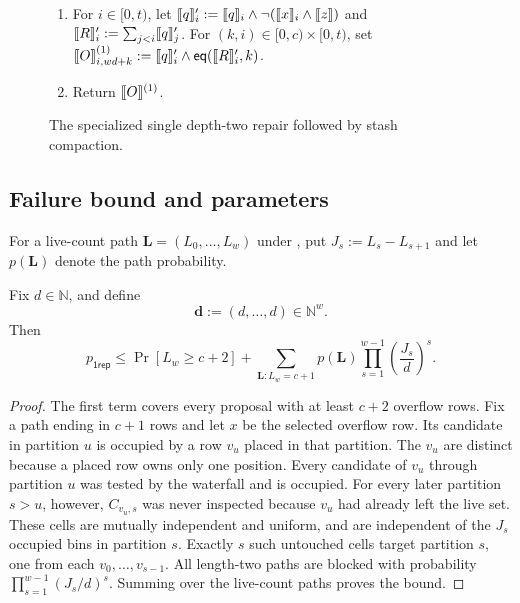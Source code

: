 \begin{figure}[H]
{\begin{minipage}{.95\textwidth}
\begin{enumerate}
  \item For $i\in[0,t)$, let
  $\share q'_i:=\share q_i\land\neg(\share x_i\land\share z)$ and
  $\share R'_i:=\sum_{j<i}\share q'_j$.  For $(k,i)\in[0,c)\times[0,t)$, set
  $\share O^{(1)}_{i,wd+k}:=\share q'_i\land
  \textsf{eq}(\share R'_i,k)$.

  \item Return $\share O^{(1)}$.
\end{enumerate}
\end{minipage}}
\caption{The specialized single depth-two repair followed by stash
compaction.\label{fig:waterfallOneRepairProtocol}}
\end{figure}

\subsection{Failure bound and parameters}

For a live-count path $\boldsymbol L=(L_0,\ldots,L_w)$ under
, put
$J_s:=L_s-L_{s+1}$ and let $p(\boldsymbol L)$ denote the path probability.

\begin{proposition}
\label{prop:waterfall-one-repair}
Fix $d\in\mathbb N$, and define
\[
 \mathbf d:=(d,\ldots,d)\in\mathbb N^w.
\]
Then
\begin{equation}\label{eq:waterfall-one-repair-bound}
 p_{\mathsf{1rep}}
 \leq \Pr[L_w\geq c+2]
 +\sum_{\boldsymbol L:L_w=c+1}
   p(\boldsymbol L)
   \prod_{s=1}^{w-1}\left(\frac{J_s}{d}\right)^s.
\end{equation}
\end{proposition}

\begin{proof}
The first term covers every proposal with at least $c+2$ overflow rows.  Fix a
path ending in $c+1$ rows and let $x$ be the selected
overflow row.  Its candidate in partition $u$ is occupied by a row $v_u$
placed in that partition.  The $v_u$ are distinct because a placed row owns
only one position.  Every candidate of $v_u$ through partition $u$ was tested
by the waterfall and is occupied.  For every later partition $s>u$, however,
$C_{v_u,s}$ was never inspected because $v_u$ had already left the live set.
These cells are mutually independent and uniform, and are independent of the
$J_s$ occupied bins in partition $s$.  Exactly $s$ such untouched cells target
partition $s$, one from each $v_0,\ldots,v_{s-1}$.  All length-two paths are
blocked with probability $\prod_{s=1}^{w-1}(J_s/d)^s$.  Summing over the
live-count paths proves the bound.
\end{proof}

